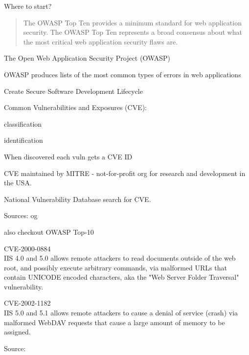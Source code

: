 \documentclass[Screen16to9,17pt]{foils}
\begin{document}
\vskip 2cm
\centerline{\LARGE Where to start?}



\begin{quote}
The OWASP Top Ten provides a minimum standard for web application
security. The OWASP Top Ten represents a broad consensus about what
the most critical web application security flaws are.
\end{quote}

\begin{list1}
\item The Open Web Application Security Project (OWASP)
\item OWASP produces lists of the most common types of errors in web applications
\item {}
\item Create Secure Software Development Lifecycle
\end{list1}




\begin{list1}
\item Common Vulnerabilities and Exposures (CVE):
  \begin{list2}
  \item classification
  \item identification
  \end{list2}
\item When discovered each vuln gets a CVE ID
\item CVE maintained by MITRE - not-for-profit
org for research and development in the USA.
\item National Vulnerability Database search for CVE.
\item Sources:  og 
\item also checkout OWASP Top-10 
\end{list1}


\begin{list1}
\item \small CVE-2000-0884\\
IIS 4.0 and 5.0 allows remote attackers to read documents outside of
the web root, and possibly execute arbitrary commands, via malformed
URLs that contain UNICODE encoded characters, aka the "Web Server
Folder Traversal" vulnerability.

\item \small CVE-2002-1182\\
IIS 5.0 and 5.1 allows remote attackers to cause a denial of service
(crash) via malformed WebDAV requests that cause a large amount of
memory to be assigned.

\item Source:\\
\end{list1}
\end{document}
